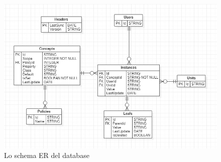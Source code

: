 \documentclass[\main/tesi.tex]{subfiles}
\begin{document}
\begin{figure}[h]
    \caption{Lo schema ER del database}
    \includegraphics[width=\textwidth]{../images/er.png}
\end{figure}
\end{document}

